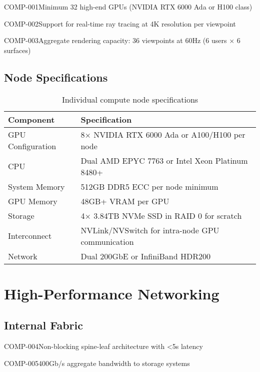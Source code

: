 \begin{requirement}{COMP-001}{Minimum 32 high-end GPUs (NVIDIA RTX 6000 Ada or H100 class)}

\begin{requirement}{COMP-002}{Support for real-time ray tracing at 4K resolution per viewpoint}

\begin{requirement}{COMP-003}{Aggregate rendering capacity: 36 viewpoints at 60Hz (6 users × 6 surfaces)}

\subsection{Node Specifications}

\begin{table}[H]
\centering
\begin{tabularx}{\textwidth}{@{}lX@{}}
\toprule
\textbf{Component} & \textbf{Specification} \\
\midrule
GPU Configuration & 8× NVIDIA RTX 6000 Ada or A100/H100 per node \\
CPU & Dual AMD EPYC 7763 or Intel Xeon Platinum 8480+ \\
System Memory & 512GB DDR5 ECC per node minimum \\
GPU Memory & 48GB+ VRAM per GPU \\
Storage & 4× 3.84TB NVMe SSD in RAID 0 for scratch \\
Interconnect & NVLink/NVSwitch for intra-node GPU communication \\
Network & Dual 200GbE or InfiniBand HDR200 \\
\bottomrule
\end{tabularx}
\caption{Individual compute node specifications}
\end{table}

\section{High-Performance Networking}

\subsection{Internal Fabric}

\begin{requirement}{COMP-004}{Non-blocking spine-leaf architecture with <5\textmu s latency}

\begin{requirement}{COMP-005}{400Gb/s aggregate bandwidth to storage systems}


\end{requirement}
\end{requirement}
\end{requirement}
\end{requirement}
\end{requirement}
